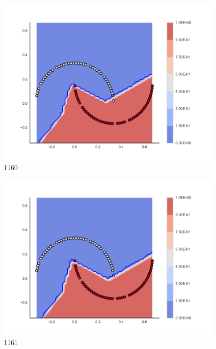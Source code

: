 \begin{subfigure}[b]{0.09\textwidth}
    \includegraphics[clip, trim=2.35cm 1.75cm 4.5cm 0cm,width=\textwidth]{img/convergence/1160.pdf}
    \caption{1160}
    \label{fig:convergence_1160}
\end{subfigure}
%
\begin{subfigure}[b]{0.09\textwidth}
    \includegraphics[clip, trim=2.35cm 1.75cm 4.5cm 0cm,width=\textwidth]{img/convergence/1161.pdf}
    \caption{1161}
    \label{fig:convergence_1161}
\end{subfigure}
%
